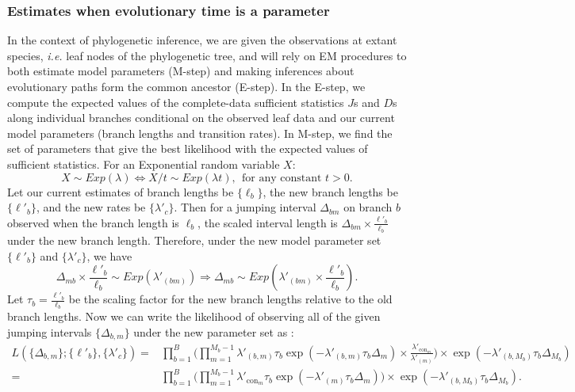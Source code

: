 \documentclass[11pt]{article}
\newcommand{\context}{\ensuremath{\mathrm{con}}}
\begin{document}
\subsubsection{Estimates when evolutionary time is a parameter}
In the context of phylogenetic inference, we are given the
observations at extant species, \textit{i.e.} leaf nodes of the
phylogenetic tree, and will rely on EM procedures to both estimate
model parameters (M-step) and making inferences about evolutionary
paths form the common ancestor (E-step).  In the E-step, we compute
the expected values of the complete-data sufficient statistics $J$s
and $D$s along individual branches conditional on the observed leaf
data and our current model parameters (branch lengths and transition
rates). In M-step, we find the set of parameters that give the best
likelihood with the expected values of sufficient
statistics. For an Exponential random variable
$X$:
\[ X \sim \mathit{Exp}(\lambda) \Leftrightarrow X/t \sim
\mathit{Exp}(\lambda t), ~~\text{for any constant $t>0$.}
\]
Let our current estimates of branch lengths be $\{\ell_b\}$, the new branch lengths be $\{\ell'_b\}$, and the new rates be $\{\lambda'_c\}$. Then for a jumping
interval $\Delta_{bm}$ on branch $b$ observed when the branch length is $\ell_b$, the scaled
interval length is $\Delta_{bm}\times \frac{\ell'_b}{\ell_b}$ under the new branch length. Therefore, under the new model parameter set $\{\ell'_b\}$ and $\{\lambda'_c\}$, we have
\[
\Delta_{mb}\times \frac{\ell'_b}{\ell_b} \sim \mathit{Exp}(\lambda'_{(bm)}) \Rightarrow
\Delta_{mb} \sim \mathit{Exp}(\lambda'_{(bm)} \times \frac{\ell'_b}{\ell_b}).
\]
Let $\tau_b = \frac{\ell'_b}{\ell_b}$ be the scaling factor for the new branch lengths relative to the old branch lengths. Now we can write the likelihood of observing all of the given jumping
intervals $\{\Delta_{b,m}\}$ under the new parameter set as :
\begin{equation}\label{eqn:liknew}
  \begin{aligned}
    L(\{\Delta_{b,m}\}; \{\ell'_b\}, \{\lambda'_c\})
    = & \prod\limits_{b=1}^B\Bigg(\prod\limits_{m=1}^{M_b-1}
    \lambda'_{(b,m)}\tau_b
    \exp(-\lambda'_{(b,m)}\tau_b\Delta_m) \times \frac{\lambda'_{\context{}_m}}{\lambda'_{(m)}}
    \Bigg) \times \exp(-\lambda'_{(b,M_b)}\tau_b\Delta_{M_b})\\
    = & \prod\limits_{b=1}^B\Bigg(
    \prod\limits_{m=1}^{M_b-1}\lambda'_{\context{}_m}\tau_b\exp(-\lambda'_{(m)}\tau_b\Delta_m)
    \Bigg)\times \exp(-\lambda'_{(b,M_b)}\tau_b\Delta_{M_b}).
  \end{aligned}
\end{equation}
\end{document}
